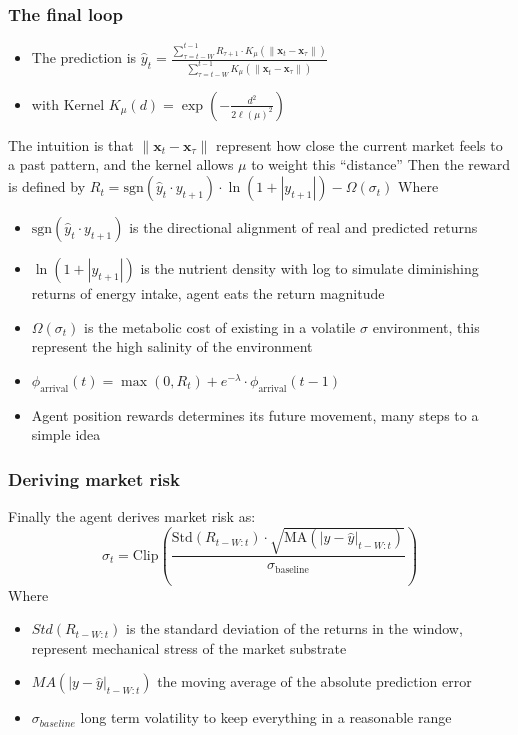 \documentclass[10pt]{beamer}
\begin{document}
		\begin{frame}
			\frametitle{The final loop}
			\begin{itemize}
			\item The prediction is $\hat{y}_t = \frac{\sum_{\tau=t-W}^{t-1} R_{\tau+1} \cdot K_{\mu}(\| \mathbf{x}_t - \mathbf{x}_{\tau} \|)}{\sum_{\tau=t-W}^{t-1} K_{\mu}(\| \mathbf{x}_t - \mathbf{x}_{\tau} \|)}$
			\item with Kernel $K_{\mu}(d) = \exp\left( -\frac{d^2}{2\ell(\mu)^2} \right)$
		\end{itemize}
		The intuition is that $\| \mathbf{x}_t - \mathbf{x}_{\tau} \|$ represent how close the current market feels to a past pattern, and the kernel allows $\mu$ to weight this ``distance''
		Then the reward is defined by $R_t = \text{sgn}(\hat{y}_t \cdot y_{t+1}) \cdot \ln\left( 1 + |y_{t+1}| \right) - \Omega(\sigma_t)$
		Where
		\begin{itemize}
			\item $\text{sgn}(\hat{y}_t \cdot y_{t+1})$ is the directional alignment of real and predicted returns
			\item $\ln\left( 1 + |y_{t+1}| \right)$ is the nutrient density with log to simulate diminishing returns of energy intake, agent eats the return magnitude
			\item $\Omega(\sigma_t)$ is the metabolic cost of existing in a volatile $\sigma$ environment, this represent the high salinity of the environment
			\item $\phi_{\text{arrival}}(t) = \max(0, R_t) + e^{-\lambda} \cdot \phi_{\text{arrival}}(t-1)$
			\item Agent position rewards determines its future movement, many steps to a simple idea
		\end{itemize}
		\end{frame}
		
		\begin{frame}
			\frametitle{Deriving market risk}
			Finally the agent derives market risk as:
			\begin{equation}
				\sigma_t = \text{Clip} \left( \frac{\text{Std}(R_{t-W:t}) \cdot \sqrt{\text{MA}(|y - \hat{y}|_{t-W:t})}}{\sigma_{\text{baseline}}} \right)
			\end{equation}
			Where
			\begin{itemize}
				\item $Std(R_{t-W:t})$ is the standard deviation of the returns in the window, represent mechanical stress of the market substrate
				\item $MA(\left|y-\hat{y}\right|_{t-W:t})$ the moving average of the absolute prediction error
				\item $\sigma_{baseline}$ long term volatility to keep everything in a reasonable range
			\end{itemize}
		\end{frame}
		
\end{document}
